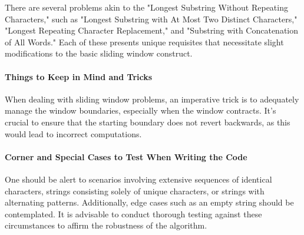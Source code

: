 There are several problems akin to the "Longest Substring Without Repeating Characters," such as "Longest Substring with At Most Two Distinct Characters," "Longest Repeating Character Replacement," and "Substring with Concatenation of All Words." Each of these presents unique requisites that necessitate slight modifications to the basic sliding window construct.

\paragraph*{Things to Keep in Mind and Tricks}

When dealing with sliding window problems, an imperative trick is to adequately manage the window boundaries, especially when the window contracts. It's crucial to ensure that the starting boundary does not revert backwards, as this would lead to incorrect computations.

\paragraph*{Corner and Special Cases to Test When Writing the Code}

One should be alert to scenarios involving extensive sequences of identical characters, strings consisting solely of unique characters, or strings with alternating patterns. Additionally, edge cases such as an empty string should be contemplated. It is advisable to conduct thorough testing against these circumstances to affirm the robustness of the algorithm.